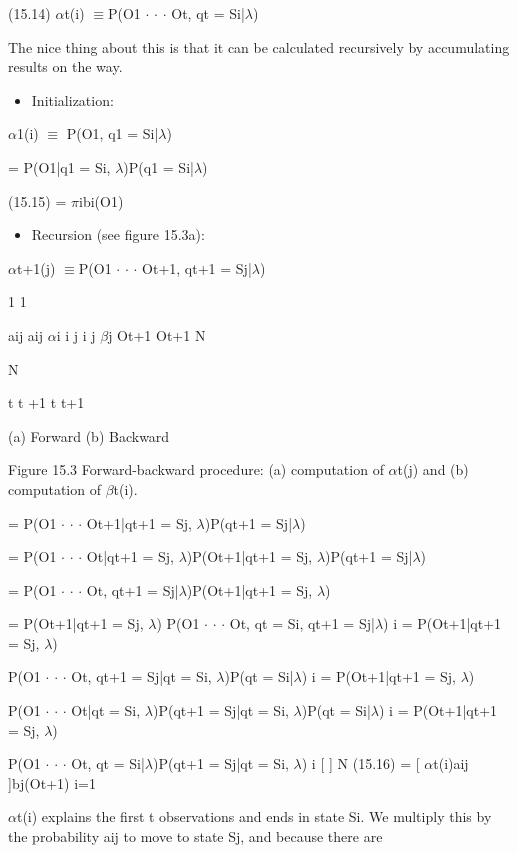 (15.14) $\alpha$t(i) $\equiv$P(O1 $\cdot$ $\cdot$ $\cdot$ Ot, qt = Si|$\lambda$)

The nice thing about this is that it can be calculated recursively by accumulating results on the way.

\begin{itemize}
\item Initialization:
\end{itemize}

$\alpha$1(i) $\equiv$ P(O1, q1 = Si|$\lambda$)

= P(O1|q1 = Si, $\lambda$)P(q1 = Si|$\lambda$)

(15.15) = $\pi$ibi(O1)

\begin{itemize}
\item Recursion (see figure 15.3a):
\end{itemize}

$\alpha$t+1(j) $\equiv$P(O1 $\cdot$ $\cdot$ $\cdot$ Ot+1, qt+1 = Sj|$\lambda$)

1 1

aij aij $\alpha$i i j i j $\beta$j Ot+1 Ot+1 N

N

t t +1 t t+1

(a) Forward (b) Backward

Figure 15.3 Forward-backward procedure: (a) computation of $\alpha$t(j) and (b) computation of $\beta$t(i).

= P(O1 $\cdot$ $\cdot$ $\cdot$ Ot+1|qt+1 = Sj, $\lambda$)P(qt+1 = Sj|$\lambda$)

= P(O1 $\cdot$ $\cdot$ $\cdot$ Ot|qt+1 = Sj, $\lambda$)P(Ot+1|qt+1 = Sj, $\lambda$)P(qt+1 = Sj|$\lambda$)

= P(O1 $\cdot$ $\cdot$ $\cdot$ Ot, qt+1 = Sj|$\lambda$)P(Ot+1|qt+1 = Sj, $\lambda$)

= P(Ot+1|qt+1 = Sj, $\lambda$) P(O1 $\cdot$ $\cdot$ $\cdot$ Ot, qt = Si, qt+1 = Sj|$\lambda$) i = P(Ot+1|qt+1 = Sj, $\lambda$)

P(O1 $\cdot$ $\cdot$ $\cdot$ Ot, qt+1 = Sj|qt = Si, $\lambda$)P(qt = Si|$\lambda$) i = P(Ot+1|qt+1 = Sj, $\lambda$)

P(O1 $\cdot$ $\cdot$ $\cdot$ Ot|qt = Si, $\lambda$)P(qt+1 = Sj|qt = Si, $\lambda$)P(qt = Si|$\lambda$) i = P(Ot+1|qt+1 = Sj, $\lambda$)

P(O1 $\cdot$ $\cdot$ $\cdot$ Ot, qt = Si|$\lambda$)P(qt+1 = Sj|qt = Si, $\lambda$) i [ ] N (15.16) = [ $\alpha$t(i)aij ]bj(Ot+1) i=1

$\alpha$t(i) explains the first t observations and ends in state Si. We multiply this by the probability aij to move to state Sj, and because there are

